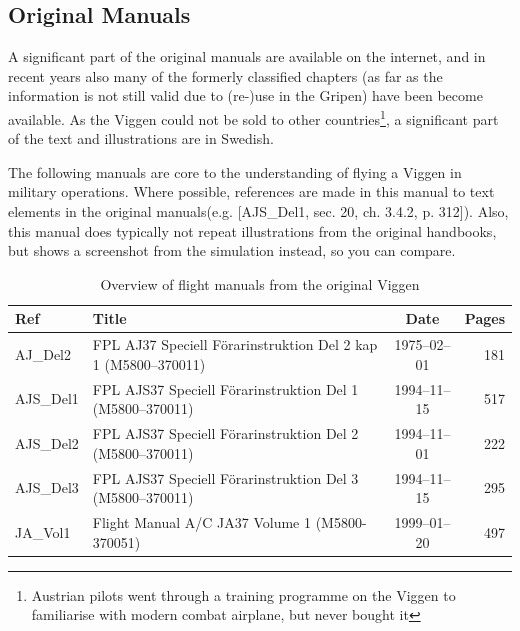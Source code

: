 \subsection{Original Manuals}
A significant part of the original manuals are available on the internet, and in recent years also many of the formerly classified chapters (as far as the information is not still valid due to (re-)use in the Gripen) have been become available. As the Viggen could not be sold to other countries\footnote{Austrian pilots went through a training programme on the Viggen to familiarise with modern combat airplane, but never bought it}, a significant part of the text and illustrations are in Swedish.

The following manuals are core to the understanding of flying a Viggen in military operations. Where possible, references are made in this manual to text elements in the original manuals(e.g. [AJS\_Del1, sec. 20, ch. 3.4.2, p. 312]). Also, this manual does typically not repeat illustrations from the original handbooks, but shows a screenshot from the simulation instead, so you can compare.

\begin{table}[!th]
\begin{tabular}{|l|l|c|r|}
\hline
Ref & Title & Date & Pages \\
\hline
AJ\_Del2 & FPL AJ37 Speciell Förarinstruktion Del 2 kap 1 (M5800--370011) & 1975--02--01 & 181 \\
AJS\_Del1 & FPL AJS37 Speciell Förarinstruktion Del 1 (M5800--370011) & 1994--11--15 & 517 \\
AJS\_Del2 & FPL AJS37 Speciell Förarinstruktion Del 2 (M5800--370011) & 1994--11--01 & 222 \\
AJS\_Del3 & FPL AJS37 Speciell Förarinstruktion Del 3 (M5800--370011) & 1994--11--15 & 295 \\
JA\_Vol1 & Flight Manual A/C JA37 Volume 1 (M5800-370051) & 1999--01--20 & 497 \\
\hline
\end{tabular}
\caption{Overview of flight manuals from the original Viggen}
\end{table}

